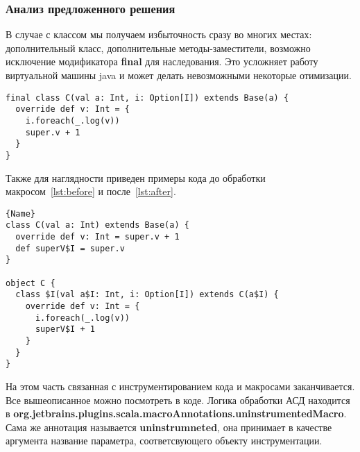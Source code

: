 \subsubsection{Анализ предложенного решения}

В случае с классом мы получаем избыточность сразу во многих местах:
дополнительный класс, дополнительные методы-заместители, возможно исключение
модификатора \textbf{final} для наследования.
Это усложняет работу виртуальной машины java и может делать невозможными
некоторые отимизации.


\begin{lstlisting}[caption={До применения макроса},label=lst:before]
final class C(val a: Int, i: Option[I]) extends Base(a) {
  override def v: Int = {
    i.foreach(_.log(v))
    super.v + 1
  }
}
\end{lstlisting}

Также для наглядности приведен примеры кода до обработки
макросом~\ref{lst:before}
и после~\ref{lst:after}.

\begin{lstlisting}[caption={После применения макроса},label=lst:after]{Name}
class C(val a: Int) extends Base(a) {
  override def v: Int = super.v + 1
  def superV$I = super.v
}

object C {
  class $I(val a$I: Int, i: Option[I]) extends C(a$I) {
    override def v: Int = {
      i.foreach(_.log(v))
      superV$I + 1
    }
  }
}
\end{lstlisting}


На этом часть связанная с инструментированием кода и макросами заканчивается.
Все вышеописанное можно посмотреть в коде.
Логика обработки АСД находится в
\textbf{org.jetbrains.plugins.scala.macroAnnotations.uninstrumentedMacro}.
Сама же аннотация называется \textbf{uninstrumneted}, она принимает в качестве
аргумента название параметра, соответсвующего объекту инструментации.

%
%
%
%
